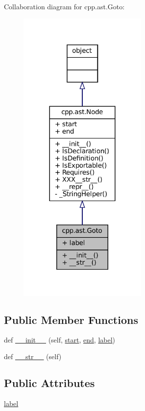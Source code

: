 Collaboration diagram for cpp.\+ast.\+Goto\+:
\nopagebreak
\begin{figure}[H]
\begin{center}
\leavevmode
\includegraphics[width=180pt]{classcpp_1_1ast_1_1Goto__coll__graph}
\end{center}
\end{figure}
\subsection*{Public Member Functions}
\begin{DoxyCompactItemize}
\item 
def \hyperlink{classcpp_1_1ast_1_1Goto_a928e79374a90d01fc060985ea1e45260}{\+\_\+\+\_\+init\+\_\+\+\_\+} (self, \hyperlink{classcpp_1_1ast_1_1Node_a7b2aa97e6a049bb1a93aea48c48f1f44}{start}, \hyperlink{classcpp_1_1ast_1_1Node_a3c5e5246ccf619df28eca02e29d69647}{end}, \hyperlink{classcpp_1_1ast_1_1Goto_a685284ea5f3b21f39aff7f5db841c8f5}{label})
\item 
def \hyperlink{classcpp_1_1ast_1_1Goto_a508b6bc091cf06bfed73a33368c236c9}{\+\_\+\+\_\+str\+\_\+\+\_\+} (self)
\end{DoxyCompactItemize}
\subsection*{Public Attributes}
\begin{DoxyCompactItemize}
\item 
\hyperlink{classcpp_1_1ast_1_1Goto_a685284ea5f3b21f39aff7f5db841c8f5}{label}
\end{DoxyCompactItemize}


